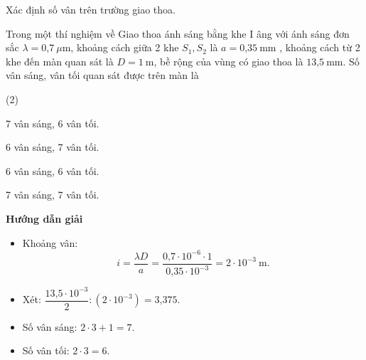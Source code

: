 \begin{dang}{Xác định số vân trên trường giao thoa.}
	
	{Trong một thí nghiệm về Giao thoa ánh sáng bằng khe I âng với ánh sáng đơn sắc $\lambda  = \text{0,7}\ \mu \text{m}$, khoảng cách giữa 2 khe $S_1, S_2$ là $a = \text{0,35}\ \text{mm}$ , khoảng cách từ 2 khe đến màn quan sát là $D = 1\ \text{m}$, bề rộng của vùng có giao thoa là $\text{13,5}\ \text{mm}$. Số vân sáng, vân tối quan sát được trên màn là
		\begin{mcq}(2)
			\item 7 vân sáng, 6 vân tối.        
			\item 6 vân sáng, 7 vân tối.
			\item 6 vân sáng, 6 vân tối.          
			\item 7 vân sáng, 7 vân tối.
		\end{mcq}
	}
	{
		\begin{center}
			\textbf{Hướng dẫn giải}
		\end{center}
		
		
		\begin{itemize}
			\item Khoảng vân: 
			\begin{equation*}
				i=\dfrac{\lambda D}{a}=\dfrac{\text {0,7} \cdot 10^{-6} \cdot 1}{\text{0,35} \cdot 10^{-3}}= 2 \cdot 10^{-3}\ \text{m}.
			\end{equation*}
			\item Xét: $\dfrac{\text{13,5}\cdot 10^{-3}}{2} : (2 \cdot 10^{-3}) =\text{3,375}$.
			\item Số vân sáng: $2 \cdot 3 + 1 = 7$.
			\item Số vân tối: $2 \cdot 3 =6$. 
			

\end{itemize}}
\end{dang}
